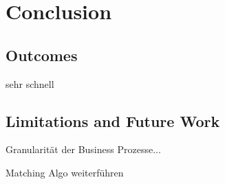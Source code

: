 \chapter{Conclusion}
\label{ch:Conclusion}


\section{Outcomes}

sehr schnell

\section{Limitations and Future Work}
Granularität der Business Prozesse...


Matching Algo weiterführen